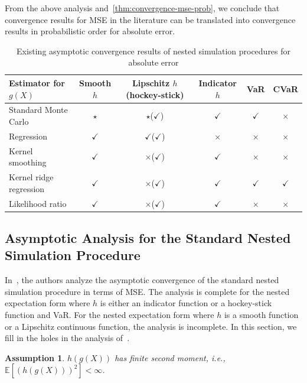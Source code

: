 \documentclass{article}
\newtheorem{assumption}{Assumption}
\begin{document}
From the above analysis and~\ref{thm:convergence-mse-prob}, we conclude that convergence results for MSE in the literature can be translated into convergence results in probabilistic order for absolute error.

\begin{table}[ht]
    \centering
    \begin{tabular}{|l|c|c|c|c|c|}
    \hline
    Estimator for $g(X)$ & Smooth $h$ & Lipschitz $h$ (hockey-stick) & Indicator $h$ & VaR & CVaR \\
    \hline
    Standard Monte Carlo & $\star$ & $\star$($\checkmark$) & $\checkmark$ & $\checkmark$ & $\times$ \\
    \hline
    Regression & $\checkmark$ & $\checkmark$($\checkmark$) & $\times$ & $\times$ & $\times$ \\
    \hline
    Kernel smoothing & $\checkmark$ & $\times$($\checkmark$) & $\checkmark$ & $\times$ & $\times$ \\
    \hline
    Kernel ridge regression & $\checkmark$ & $\times$($\checkmark$) & $\checkmark$ & $\checkmark$ & $\checkmark$ \\
    \hline
    Likelihood ratio & $\checkmark$ & $\times$($\checkmark$) & $\checkmark$ & $\times$ & $\times$ \\
    \hline
    \end{tabular}
    \caption{Existing asymptotic convergence results of nested simulation procedures for absolute error}
    \label{tab:asymConv-ae}
\end{table}

\subsection{Asymptotic Analysis for the Standard Nested Simulation Procedure}
In~\cite{gordy2010nested}, the authors analyze the asymptotic convergence of the standard nested simulation procedure in terms of MSE. 
The analysis is complete for the nested expectation form where $h$ is either an indicator function or a hockey-stick function and VaR. 
For the nested expectation form where $h$ is a smooth function or a Lipschitz continuous function, the analysis is incomplete.
In this section, we fill in the holes in the analysis of~\cite{gordy2010nested}.

\begin{assumption} \label{as:sns}
    $h(g(X))$ has finite second moment, i.e., $\mathbb{E} \left[ \left( h(g(X)) \right)^2 \right] < \infty$.
\end{assumption}
\end{document}
